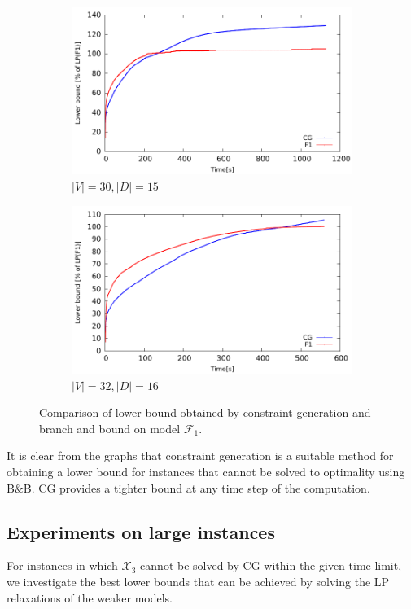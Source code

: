 \begin{figure}[!htb]
    \begin{subfigure}[b]{0.49\textwidth}
        \includegraphics[width=\textwidth]{lower-bound-30-15}
        \caption{$|V|=30, |D|=15$}
        \label{fig:cggr30-15}
    \end{subfigure}
    \hfill %
    \begin{subfigure}[b]{0.49\textwidth}
        \includegraphics[width=\textwidth]{lower-bound-32-16}
        \caption{$|V|=32, |D|=16$}
        \label{fig:cggr32-16}
    \end{subfigure}
  \caption{Comparison of lower bound obtained by constraint generation and branch and bound on model $\mathcal{F}_1$. } \label{fig:cggr}
\end{figure} 

It is clear from the graphs that constraint generation is a suitable method for obtaining a lower bound for instances that cannot be solved to optimality using B\&B. CG provides a tighter bound at any time step of the computation.

\subsection{Experiments on large instances}

For instances in which $\mathcal{X}_3$ cannot be solved by CG within the given time limit, we investigate the best lower bounds that can be achieved by solving the LP relaxations of the weaker models.
